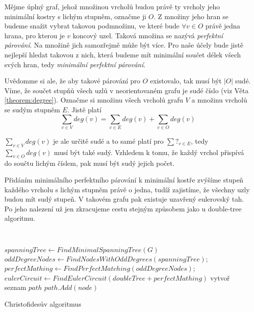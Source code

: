 \documentclass[
  biblatex,
  figures=false,
  glossaries,
  index
]{kidiplom}
\begin{document}
Mějme úplný graf, jehož množinou vrcholů budou právě ty vrcholy jeho minimální kostry s lichým stupněm, označme ji $O$. Z množiny jeho hran se budeme snažit vybrat takovou podmnožinu, ve které bude $\forall v \in O$ právě jedna hrana, pro kterou je $v$ koncový uzel. Taková množina se nazývá \textit{perfektní párování}. Na množině jich samozřejmě může být více. Pro naše účely bude jistě nejlepší hledat takovou z nich, která budeme mít minimální součet délek všech svých hran, tedy \textit{minimální perfektní párování}.

Uvědomme si ale, že aby takové párování pro $O$ existovalo, tak musí být $|O|$ sudé. Víme, že součet stupňů všech uzlů v neorientovaném grafu je sudé číslo (viz Věta \ref{theorem:degree}). Označme si množinu všech vrcholů grafu $V$ a množinu vrcholů se sudým stupněm $E$. Jistě platí
$$
\sum_{v \in V} deg(v) = \sum_{v \in E} deg(v) + \sum_{v \in O} deg(v)
$$

$\sum_{v \in V} deg(v)$ je ale určitě sudé a to samé platí pro $\sum?_{v \in E}$, tedy $\sum_{v \in O} deg(v)$ musí být také sudý. Vzhledem k tomu, že každý vrchol přispívá do součtu lichým číslem, pak musí být sudý jejich počet.

Přidáním minimálního perfektního párování k minimální kostře zvýšíme stupeň každého vrcholu s lichým stupněm právě o jedna, tudíž zajistíme, že všechny uzly budou mít sudý stupeň. V takovém grafu pak existuje uzavřený eulerovský tah. Po jeho nalezení už jen zkracujeme cestu stejným způsobem jako u double-tree algoritmu.\leavevmode\newline

{\SetAlgoNoLine\
\begin{algorithm}[H]
$spanningTree \leftarrow FindMinimalSpanningTree(G)$\;
$oddDegreeNodes \leftarrow FindNodesWithOddDegrees(spanningTree)$;
$perfectMathing \leftarrow FindPerfectMatching(oddDegreeNodes)$;
$eulerCircuit \leftarrow FindEulerCircuit(doubleTree + perfectMathing)$\;
vytvoř seznam $path$\;
{
	{
		$path.Add(node)$\;
	}
}
\caption{Christofidesův algoritmus}
\end{algorithm}}\leavevmode\newline
\end{document}
